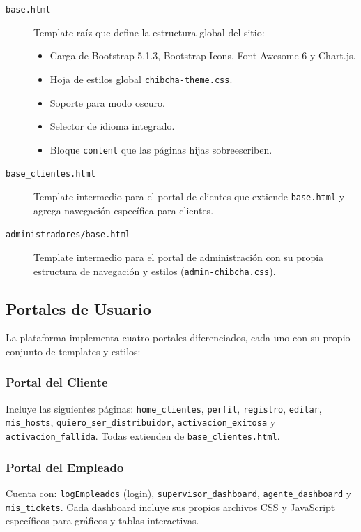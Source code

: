 \documentclass[12pt, a4paper]{article}
\begin{document}
\begin{description}
    \item[\texttt{base.html}] Template raíz que define la estructura global del sitio:
    \begin{itemize}
        \item Carga de Bootstrap 5.1.3, Bootstrap Icons, Font Awesome 6 y Chart.js.
        \item Hoja de estilos global \texttt{chibcha-theme.css}.
        \item Soporte para modo oscuro.
        \item Selector de idioma integrado.
        \item Bloque \texttt{content} que las páginas hijas sobreescriben.
    \end{itemize}

    \item[\texttt{base\_clientes.html}] Template intermedio para el portal de clientes que extiende \texttt{base.html} y agrega navegación específica para clientes.

    \item[\texttt{administradores/base.html}] Template intermedio para el portal de administración con su propia estructura de navegación y estilos (\texttt{admin-chibcha.css}).
\end{description}

\subsection{Portales de Usuario}

La plataforma implementa cuatro portales diferenciados, cada uno con su propio conjunto de templates y estilos:

\subsubsection{Portal del Cliente}
Incluye las siguientes páginas: \texttt{home\_clientes}, \texttt{perfil}, \texttt{registro}, \texttt{editar}, \texttt{mis\_hosts}, \texttt{quiero\_ser\_distribuidor}, \texttt{activacion\_exitosa} y \texttt{activacion\_fallida}. Todas extienden de \texttt{base\_clientes.html}.

\subsubsection{Portal del Empleado}
Cuenta con: \texttt{logEmpleados} (login), \texttt{supervisor\_dashboard}, \texttt{agente\_dashboard} y \texttt{mis\_tickets}. Cada dashboard incluye sus propios archivos CSS y JavaScript específicos para gráficos y tablas interactivas.
\end{document}

